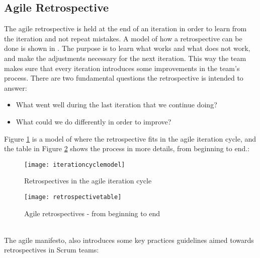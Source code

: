\subsection{Agile Retrospective}
The agile retrospective is held at the end of an iteration in order to learn from the iteration and not repeat mistakes. A model of how a retrospective can be done is shown in \cite{Derby2006}. The purpose is to learn what works and what does not work, and make the adjustments necessary for the next iteration. This way the team makes sure that every iteration introduces some improvements in the team's process. There are two fundamental questions the retrospective is intended to answer:
\begin{itemize}
\item What went well during the last iteration that we continue doing?
\item What could we do differently in order to improve?
\end{itemize}
Figure \ref{fig:itcyclemodel} is a model of where the retrospective fits in the agile iteration cycle\cite{Derby2006}, and the table in Figure \ref{fig:retrospectivetable} shows the process in more details, from beginning to end.\cite{Derby2006}:
\begin{figure}[!htpb]
\centering
	\texttt{[image: iterationcyclemodel]}
\caption{Retrospectives in the agile iteration cycle}
\label{fig:itcyclemodel}
\end{figure}
\begin{figure}[!htpb]
\centering
	\texttt{[image: retrospectivetable]}
\caption{Agile retrospectives - from beginning to end}
\label{fig:retrospectivetable}
\end{figure}
\\
The agile manifesto, also introduces some key practices guidelines aimed towards retrospectives in Scrum teams\cite{agilemanifesto}:

